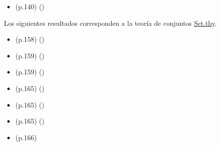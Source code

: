\begin{isabellebody}
\begin{isamarkuptext}
\begin{itemize}
    \item (p.140)  
      \hfill ()
  \end{itemize}%
\end{isamarkuptext}\isamarkuptrue%
%
\isadelimdocument
%
\endisadelimdocument
%
\isatagdocument
%
\isamarkuptrue%
%
\endisatagdocument
{\isafolddocument}%
%
\isadelimdocument
%
\endisadelimdocument
%
\begin{isamarkuptext}%
Los siguientes resultados corresponden a la teoría de conjuntos 
  \href{https://acortar.link/adxMr}{Set.thy}.%
\end{isamarkuptext}\isamarkuptrue%
%
\begin{isamarkuptext}%
\begin{itemize}
    \item (p.158)  
      \hfill ()
    \item (p.159)  
      \hfill ()
    \item (p.159)  
      \hfill ()
    \item (p.165)  
      \hfill ()
    \item (p.165)  
      \hfill ()
    \item (p.165)  
      \hfill ()
    \item (p.166)  

\end{itemize}
\end{isamarkuptext}
\end{isabellebody}
